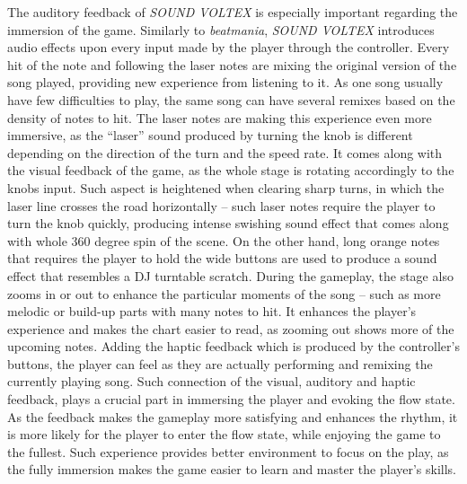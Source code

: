 The auditory feedback of \textit{SOUND VOLTEX} is especially important regarding the immersion of the game. Similarly to \textit{beatmania}, \textit{SOUND VOLTEX} introduces audio effects upon every input made by the player through the controller. Every hit of the note and following the laser notes are mixing the original version of the song played, providing new experience from listening to it. As one song usually have few difficulties to play, the same song can have several remixes based on the density of notes to hit. The laser notes are making this experience even more immersive, as the “laser” sound produced by turning the knob is different depending on the direction of the turn and the speed rate. It comes along with the visual feedback of the game, as the whole stage is rotating accordingly to the knobs input. Such aspect is heightened when clearing sharp turns, in which the laser line crosses the road horizontally -- such laser notes require the player to turn the knob quickly, producing intense swishing sound effect that comes along with whole 360 degree spin of the scene. On the other hand, long orange notes that requires the player to hold the wide buttons are used to produce a sound effect that resembles a DJ turntable scratch. During the gameplay, the stage also zooms in or out to enhance the particular moments of the song -- such as more melodic or build-up parts with many notes to hit. It enhances the player’s experience and makes the chart easier to read, as zooming out shows more of the upcoming notes. Adding the haptic feedback which is produced by the controller’s buttons, the player can feel as they are actually performing and remixing the currently playing song.
Such connection of the visual, auditory and haptic feedback, plays a crucial part in immersing the player and evoking the flow state. As the feedback makes the gameplay more satisfying and enhances the rhythm, it is more likely for the player to enter the flow state, while enjoying the game to the fullest. Such experience provides better environment to focus on the play, as the fully immersion makes the game easier to learn and master the player’s skills. 


